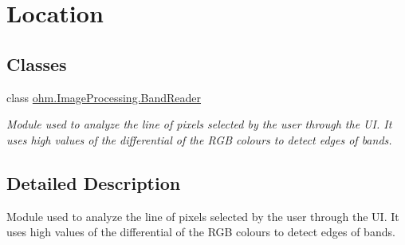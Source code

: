 \hypertarget{group___band}{}\section{Location}
\label{group___band}
\subsection*{Classes}
\begin{DoxyCompactItemize}
\item 
class \hyperlink{classohm_1_1_image_processing_1_1_band_reader}{ohm.\+Image\+Processing.\+Band\+Reader}
\begin{DoxyCompactList}\small\item\em Module used to analyze the line of pixels selected by the user through the UI. It uses high values of the differential of the R\+GB colours to detect edges of bands. \end{DoxyCompactList}\end{DoxyCompactItemize}


\subsection{Detailed Description}
Module used to analyze the line of pixels selected by the user through the UI. It uses high values of the differential of the R\+GB colours to detect edges of bands. 